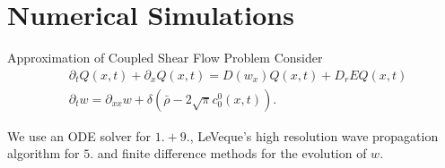 \section{Numerical Simulations}

\begin{frame}{Approximation of Coupled Shear Flow Problem}
\scriptsize
Consider
\begin{equation}
	\begin{split}
		&\partial_t Q(x,t) + \partial_x Q(x,t) =  D(w_x)Q(x,t)+ D_rEQ(x,t) \\
		&\partial_{t}w = \partial_{xx}w + \delta(\bar{\rho}-2\sqrt{\pi} c^0_0(x,t)).
	\end{split}
	\label{coupledsys_1d}
\end{equation}
\pause
\begin{table}[h]
	\centering
	\caption{Splitting algorithm for solving the coupled shear flow problem (\cite{dahm2024numericaldiscretisationhyperbolicsystems})}
\end{table}
We use an ODE solver for $1.+9.$, LeVeque’s high resolution wave propagation algorithm for $5.$ and finite difference methods for the evolution of $w$.
\end{frame}


